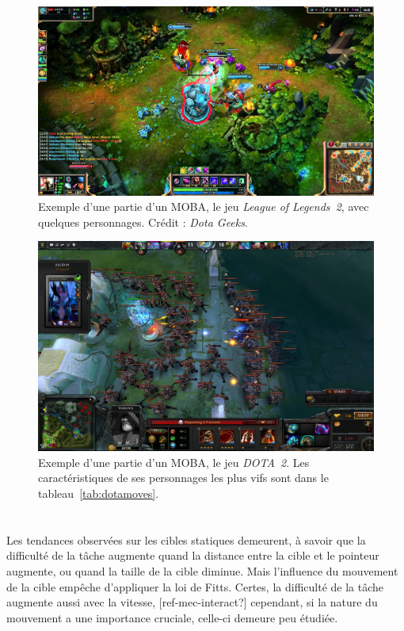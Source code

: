 	\begin{figure}[ht]
		\centering
		\includegraphics[width=\textwidth]{figures/lol2}
		\caption{Exemple d'une partie d'un MOBA, le jeu \emph{League of Legends~2}, avec quelques personnages. Crédit : \emph{Dota Geeks}.}
		\label{fig:lol2}
	\end{figure}
	
	\begin{figure}[ht]
		\centering
		\includegraphics[width=\textwidth]{figures/dota2}
		\caption{Exemple d'une partie d'un MOBA, le jeu \emph{DOTA~2}. Les caractéristiques de ses personnages les plus vifs sont dans le tableau~\ref{tab:dotamoves}.}
		\label{fig:dota2}
	\end{figure}
	
	
	\section{}    
	Les tendances observées sur les cibles statiques demeurent, à savoir que la difficulté de la tâche augmente quand la distance entre la cible et le pointeur augmente, ou quand la taille de la cible diminue. Mais l'influence du mouvement de la cible empêche d'appliquer la loi de Fitts. Certes, la difficulté de la tâche augmente aussi avec la vitesse, [ref-mec-interact?] cependant, si la nature du mouvement a une importance cruciale, celle-ci demeure peu étudiée.
    
